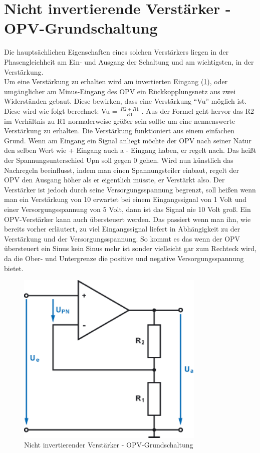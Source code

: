 \section{Nicht invertierende Verstärker - OPV-Grundschaltung}\label{sec:3.5}
Die hauptsächlichen Eigenschaften eines solchen Verstärkers liegen in der Phasengleichheit am Ein- und Ausgang der Schaltung und am wichtigsten, in der Verstärkung. \\
Um eine Verstärkung zu erhalten wird am invertierten Eingang (\ref{fig:3.5.1}), oder umgänglicher am Minus-Eingang des OPV ein Rückkopplungsnetz aus zwei Widerständen gebaut.
Diese bewirken, dass eine Verstärkung \enquote{Vu} möglich ist.
Diese wird wie folgt berechnet: Vu = $\frac{R2+R1}{R1}$ .
Aus der Formel geht hervor das R2 im Verhältnis zu R1 normalerweise größer sein sollte um eine nennenswerte Verstärkung zu erhalten.
Die Verstärkung funktioniert aus einem einfachen Grund.
Wenn am Eingang ein Signal anliegt möchte der OPV nach seiner Natur den selben Wert wie + Eingang auch a - Eingang haben, er regelt nach.
Das heißt der Spannungsunterschied Upn soll gegen 0 gehen.
Wird nun künstlich das Nachregeln beeinflusst, indem man einen Spannungsteiler einbaut, regelt der OPV den Ausgang höher als er eigentlich müsste, er Verstärkt also.
Der Verstärker ist jedoch durch seine Versorgungsspannung begrenzt, soll heißen wenn man ein Verstärkung von 10 erwartet bei einem Eingangssignal von 1 Volt und einer Versorgungsspannung von 5 Volt, dann ist das Signal nie 10 Volt groß.
Ein OPV-Verstärker kann auch übersteuert werden.
Das passiert wenn man ihn, wie bereits vorher erläutert, zu viel Eingangssignal liefert in Abhängigkeit zu der Verstärkung und der Versorgungsspannung.
So kommt es das wenn der OPV übersteuert ein Sinus kein Sinus mehr ist sonder vielleicht gar zum Rechteck wird, da die Ober- und Untergrenze die positive und negative Versorgungsspannung bietet.
\begin{figure} [H]
	\centering	
	\includegraphics[width=0.8\textwidth]{img/Grundlagen/OPV-Verstaerker/OPV-VerstaerkerGrundschaltung.png}
	\caption[Nicht invertierender Verstärker - OPV-Grundschaltung]{Nicht invertierender Verstärker - OPV-Grundschaltung\footnotemark}
	\label {fig:3.5.1}
\end{figure}


